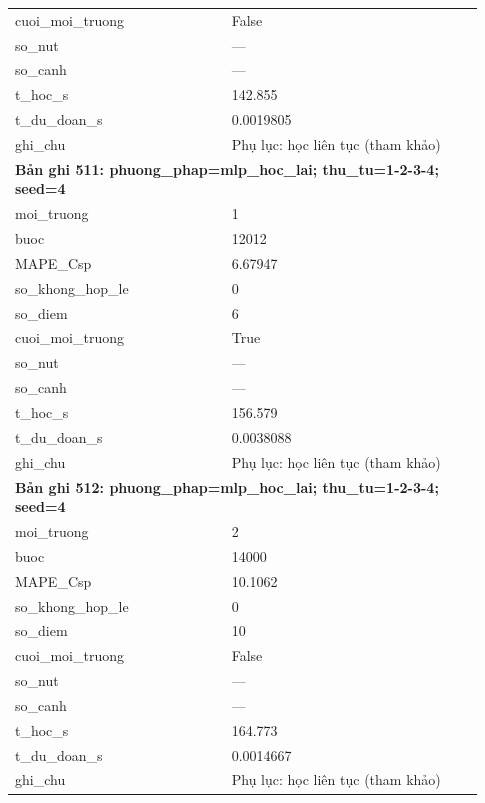 \begin{longtable}{p{0.43\linewidth}p{0.50\linewidth}}
cuoi\_\allowbreak moi\_\allowbreak truong & False \\
so\_\allowbreak nut & — \\
so\_\allowbreak canh & — \\
t\_\allowbreak hoc\_\allowbreak s & 142.855 \\
t\_\allowbreak du\_\allowbreak doan\_\allowbreak s & 0.0019805 \\
ghi\_\allowbreak chu & Phụ lục: học liên tục (tham khảo) \\
\midrule
\multicolumn{2}{p{0.95\linewidth}}{\textbf{Bản ghi 511: phuong\_phap=mlp\_hoc\_lai; thu\_tu=1-2-3-4; seed=4}} \\
moi\_\allowbreak truong & 1 \\
buoc & 12012 \\
MAPE\_\allowbreak Csp & 6.67947 \\
so\_\allowbreak khong\_\allowbreak hop\_\allowbreak le & 0 \\
so\_\allowbreak diem & 6 \\
cuoi\_\allowbreak moi\_\allowbreak truong & True \\
so\_\allowbreak nut & — \\
so\_\allowbreak canh & — \\
t\_\allowbreak hoc\_\allowbreak s & 156.579 \\
t\_\allowbreak du\_\allowbreak doan\_\allowbreak s & 0.0038088 \\
ghi\_\allowbreak chu & Phụ lục: học liên tục (tham khảo) \\
\midrule
\multicolumn{2}{p{0.95\linewidth}}{\textbf{Bản ghi 512: phuong\_phap=mlp\_hoc\_lai; thu\_tu=1-2-3-4; seed=4}} \\
moi\_\allowbreak truong & 2 \\
buoc & 14000 \\
MAPE\_\allowbreak Csp & 10.1062 \\
so\_\allowbreak khong\_\allowbreak hop\_\allowbreak le & 0 \\
so\_\allowbreak diem & 10 \\
cuoi\_\allowbreak moi\_\allowbreak truong & False \\
so\_\allowbreak nut & — \\
so\_\allowbreak canh & — \\
t\_\allowbreak hoc\_\allowbreak s & 164.773 \\
t\_\allowbreak du\_\allowbreak doan\_\allowbreak s & 0.0014667 \\
ghi\_\allowbreak chu & Phụ lục: học liên tục (tham khảo) \\

\end{longtable}
